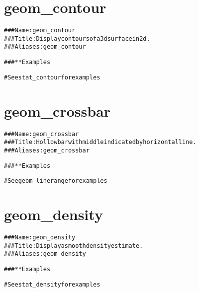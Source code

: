 \documentclass[a4paper,titlepage]{tufte-handout}\usepackage[]{graphicx}\usepackage[]{color}
\makeatletter
\newenvironment{kframe}{%
 \def\at@end@of@kframe{}%
 \ifinner\ifhmode%
  \def\at@end@of@kframe{\end{minipage}}%
  \begin{minipage}{\columnwidth}%
 \fi\fi%
 \def\FrameCommand##1{\hskip\@totalleftmargin \hskip-\fboxsep
 \colorbox{shadecolor}{##1}\hskip-\fboxsep
     \hskip-\linewidth \hskip-\@totalleftmargin \hskip\columnwidth}%
 \MakeFramed {\advance\hsize-\width
   \@totalleftmargin\z@ \linewidth\hsize
   \@setminipage}}%
 {\par\unskip\endMakeFramed%
 \at@end@of@kframe}
\newenvironment{knitrout}{}{} %
\makeatother
\begin{document}
\section{geom\_contour}

\begin{knitrout}
\color{fgcolor}\begin{kframe}
\begin{alltt}
### Name: geom_contour
### Title: Display contours of a 3d surface in 2d.
### Aliases: geom_contour

### ** Examples

# See stat_contour for examples



\end{alltt}
\end{kframe}
\end{knitrout}



\section{geom\_crossbar}

\begin{knitrout}
\color{fgcolor}\begin{kframe}
\begin{alltt}
### Name: geom_crossbar
### Title: Hollow bar with middle indicated by horizontal line.
### Aliases: geom_crossbar

### ** Examples

# See geom_linerange for examples



\end{alltt}
\end{kframe}
\end{knitrout}



\section{geom\_density}

\begin{knitrout}
\color{fgcolor}\begin{kframe}
\begin{alltt}
### Name: geom_density
### Title: Display a smooth density estimate.
### Aliases: geom_density

### ** Examples

# See stat_density for examples



\end{alltt}
\end{kframe}
\end{knitrout}
\end{document}
